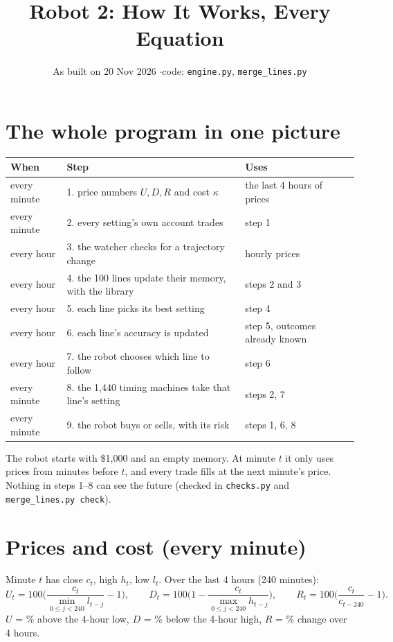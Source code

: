 \documentclass[11pt]{article}
\title{Robot 2: How It Works, Every Equation}
\date{As built on 20 Nov 2026 \quad$\cdot$\quad code: \texttt{engine.py}, \texttt{merge\_lines.py}}
\begin{document}
\maketitle
\vspace{-1.5em}

\section*{The whole program in one picture}

\begin{center}
\renewcommand{\arraystretch}{1.3}
\begin{tabular}{@{}l l l@{}}
\toprule
When & Step & Uses \\
\midrule
every minute & 1. price numbers $U, D, R$ and cost $\kappa$ & the last 4 hours of prices \\
every minute & 2. every setting's own account trades & step 1 \\
every hour & 3. the watcher checks for a trajectory change & hourly prices \\
every hour & 4. the 100 lines update their memory, with the library & steps 2 and 3 \\
every hour & 5. each line picks its best setting & step 4 \\
every hour & 6. each line's accuracy is updated & step 5, outcomes already known \\
every hour & 7. the robot chooses which line to follow & step 6 \\
every minute & 8. the 1,440 timing machines take that line's setting & steps 2, 7 \\
every minute & 9. the robot buys or sells, with its risk & steps 1, 6, 8 \\
\bottomrule
\end{tabular}
\end{center}

The robot starts with \$1{,}000 and an empty memory. At minute $t$ it only uses prices from minutes
before $t$, and every trade fills at the next minute's price. Nothing in steps 1--8 can see the future
(checked in \texttt{checks.py} and \texttt{merge\_lines.py check}).

\section{Prices and cost (every minute)}

Minute $t$ has close $c_t$, high $h_t$, low $l_t$. Over the last 4 hours (240 minutes):
\[
U_t = 100\Big(\frac{c_t}{\min_{0\le j<240} l_{t-j}} - 1\Big),\qquad
D_t = 100\Big(1 - \frac{c_t}{\max_{0\le j<240} h_{t-j}}\Big),\qquad
R_t = 100\Big(\frac{c_t}{c_{t-240}} - 1\Big).
\]
$U$ = \% above the 4-hour low, $D$ = \% below the 4-hour high, $R$ = \% change over 4 hours.
\end{document}
